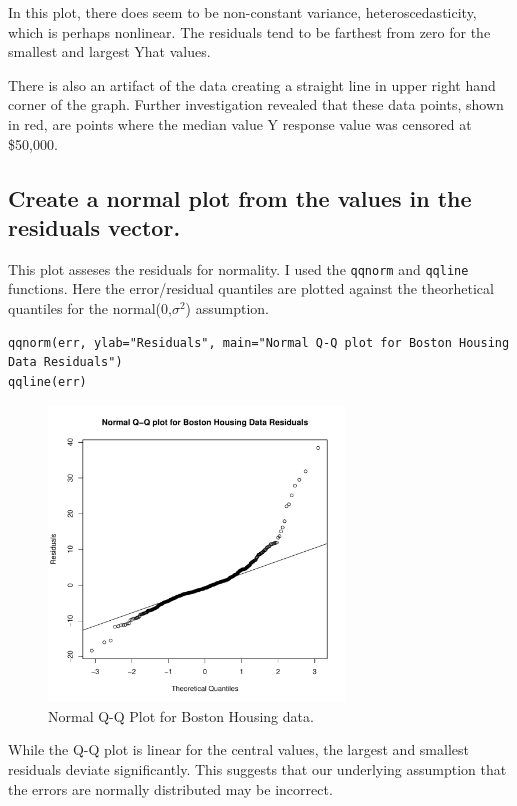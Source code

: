 \documentclass[11pt]{article}
\begin{document}
In this plot, there does seem to be non-constant variance,
heteroscedasticity, which is perhaps nonlinear. The residuals 
tend to be farthest from zero for the smallest and largest Yhat
values.

There is also an artifact of the data creating a straight line in 
upper right hand corner of the graph. Further investigation revealed
that these data points, shown in red, are points where the median
value  Y response value was censored at \$50,000. 
\subsection{Create a normal plot from the values in the residuals vector.}
\label{sec-4-5}


This plot asseses the residuals for normality. I used the \verb~qqnorm~
and \verb~qqline~ functions. Here the error/residual quantiles are plotted 
against the theorhetical quantiles for the normal(0,$\sigma$$^2$) assumption.


\begin{verbatim}
qqnorm(err, ylab="Residuals", main="Normal Q-Q plot for Boston Housing Data Residuals")
qqline(err)
\end{verbatim}

\begin{figure}[H]
\centering
\includegraphics[width=0.7\textwidth]{HW2_4e.pdf}
\caption{Normal Q-Q Plot for Boston Housing data.}
\end{figure}

While the Q-Q plot is linear for the central values, the largest and
smallest residuals deviate significantly. This suggests that our
underlying assumption that the errors are normally distributed may
be incorrect.
\end{document}
